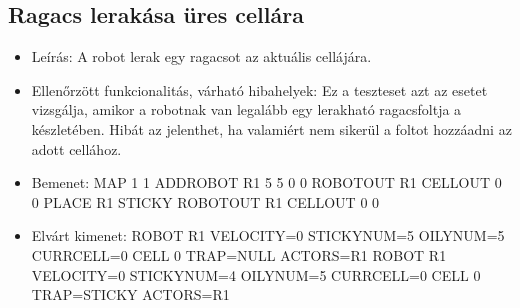 \subsection{Ragacs lerakása üres cellára}
\begin{itemize}
	\item Leírás: \newline
	A robot lerak egy ragacsot az aktuális cellájára.
	\item Ellenőrzött funkcionalitás, várható hibahelyek: \newline
	Ez a teszteset azt az esetet vizsgálja, amikor a robotnak van legalább egy lerakható ragacsfoltja a készletében. Hibát az jelenthet, ha valamiért nem sikerül a foltot hozzáadni az adott cellához.
	\item Bemenet: \newline
MAP 1 1 \newline
ADDROBOT R1 5 5 0 0	 \newline
ROBOTOUT R1 \newline
CELLOUT 0 0 \newline 
PLACE R1 STICKY \newline
ROBOTOUT R1 \newline
CELLOUT 0 0

	\item Elvárt kimenet: \newline
ROBOT R1 VELOCITY=0 STICKYNUM=5 OILYNUM=5 CURRCELL=0 \newline
CELL 0 TRAP=NULL ACTORS=R1 \newline
ROBOT R1 VELOCITY=0 STICKYNUM=4 OILYNUM=5 CURRCELL=0 \newline
CELL 0 TRAP=STICKY ACTORS=R1 

\end{itemize}

